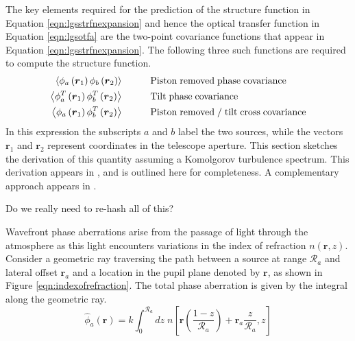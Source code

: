 The key elements required for the prediction of the structure function
in Equation \ref{eqn:lgsstrfnexpansion} and hence the optical transfer
function in Equation \ref{eqn:lgsotfa} are the two-point covariance
functions that appear in Equation \ref{eqn:lgsstrfnexpansion}.  The
following three such functions are required to compute the structure
function.
\begin{equation}\label{tpcf}
\begin{aligned}
\left\langle \phi_{a}\left(\boldsymbol{r}_{1}\right) \phi_{b}\left(\boldsymbol{r}_{2}\right) \right\rangle &\quad\quad\quad {\rm Piston\;removed\;phase\;covariance} \\
\left\langle \phi^{T}_{a}\left(\boldsymbol{r}_{1}\right) \phi^{T}_{b}\left(\boldsymbol{r}_{2}\right) \right\rangle &\quad\quad\quad {\rm Tilt\;phase\;covariance} \\
\left\langle \phi_{a}\left(\boldsymbol{r}_{1}\right) \phi^{T}_{b}\left(\boldsymbol{r}_{2}\right) \right\rangle &\quad\quad\quad {\rm Piston\;removed\;/\;tilt\;cross\;covariance} \\
\end{aligned}
\end{equation}
In this expression the subscripts $a$ and $b$ label the two sources,
while the vectors $\boldsymbol{r}_{1}$ and $\boldsymbol{r}_{2}$
represent coordinates in the telescope aperture.  This section
sketches the derivation of this quantity assuming a Komolgorov
turbulence spectrum.  This derivation appears in
\cite{Tyler:1994}, and is outlined here for
completeness.  A complementary approach appears in 
\cite{Sasiela:2007}.
\begin{notes}
Do we really need to re-hash all of this? 
\end{notes}

Wavefront phase aberrations arise from the passage of light through
the atmosphere as this light encounters variations in the index of
refraction $n\left(\boldsymbol{r},z\right)$.  Consider a geometric ray
traversing the path between a source at range $\mathcal{R}_{a}$ and
lateral offset $\boldsymbol{r}_{a}$ and a location in the pupil plane
denoted by $\boldsymbol{r}$, as shown in Figure
\ref{eqn:indexofrefraction}.  The total phase aberration is given by the integral
along the geometric ray.
\begin{equation}\label{eqn:totalphase_n}
\hat{\phi}_{a}\left(\boldsymbol{r}\right) = k \int_{0}^{\mathcal{R}_{a}} dz \; 
n\left[\boldsymbol{r}\left( \frac{1-z}{\mathcal{R}_{a}} \right) + \boldsymbol{r}_{a} \frac{z}{\mathcal{R}_{a}}, z\right]
\end{equation}


